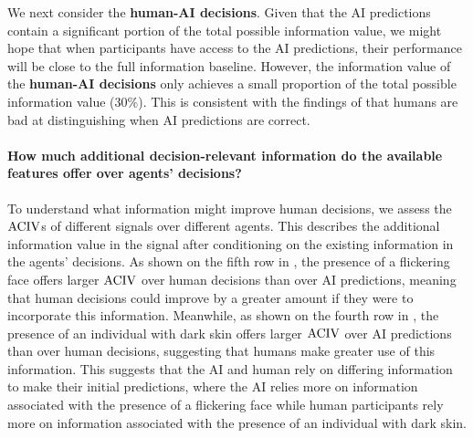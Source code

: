 We next consider the \textbf{\textcolor{humanaidecision}{human-AI decisions}}. %
Given that the AI predictions contain a significant portion of the total possible information value, we might hope that when participants have access to the AI predictions, their performance will be close to the full information baseline.
However, the information value of the \textbf{\textcolor{humanaidecision}{human-AI decisions}} only achieves a small proportion of the total possible information value ($30\%$). %
This is consistent with the findings of \citet{guo2024decision} that humans are bad at distinguishing when AI predictions are correct.


\paragraph{How much additional decision-relevant information do the available features offer over agents' decisions?}
To understand what information might improve human decisions, we assess the $\operatorname{ACIV}$s of different signals over different agents. This describes the additional information value in the signal after conditioning on the existing information in the agents' decisions.
As shown on the fifth row in , the presence of a flickering face offers larger $\operatorname{ACIV}$ over human decisions than over AI predictions, meaning that human decisions could improve by a greater amount if they were to incorporate this information. 
Meanwhile, as shown on the fourth row in , the presence of an individual with dark skin offers larger $\operatorname{ACIV}$ over AI predictions than over human decisions, suggesting that humans make greater use of this information.
This suggests that the AI and human rely on differing information to make their initial predictions, where the AI relies more on information associated with the presence of a flickering face while human participants rely more on information associated with the presence of an individual with dark skin.

